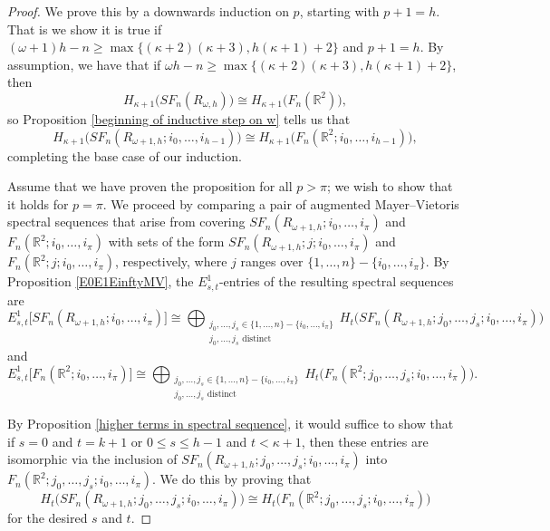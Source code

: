 \documentclass[pagebackref,colorlinks,citecolor=blue,linkcolor=blue,urlcolor=blue,filecolor=blue]{article}
\theoremstyle{definition}\newtheorem{definition}[thm]{Definition}
\theoremstyle{definition}
\newcommand{\R}{\ensuremath{\mathbb{R}}}
\begin{document}
\begin{proof}
We prove this by a downwards induction on $p$, starting with $p+1=h$.
That is we show it is true if $(\omega+1)h-n\ge\max\big\{(\kappa+2)(\kappa+3), h(\kappa+1)+2\big\}$ and $p+1=h$.
By assumption, we have that if $\omega h-n\ge\max\big\{(\kappa+2)(\kappa+3), h(\kappa+1)+2\big\}$, then
\[
H_{\kappa+1}\big(SF_{n}(R_{\omega,h})\big)\cong H_{\kappa+1}\big(F_{n}(\R^{2})\big),
\]
so Proposition \ref{beginning of inductive step on w} tells us that
\[
H_{\kappa+1}\big(SF_{n}(R_{\omega+1,h}; i_{0}, \dots, i_{h-1})\big)\cong  H_{\kappa+1}\big(F_{n}(\R^{2}; i_{0}, \dots, i_{h-1})\big),
\]
completing the base case of our induction.

Assume that we have proven the proposition for all $p>\pi$; we wish to show that it holds for $p=\pi$.
We proceed by comparing a pair of augmented Mayer--Vietoris spectral sequences that arise from covering $SF_{n}(R_{\omega+1, h};i_{0}, \dots, i_{\pi})$ and $F_{n}(\R^{2}; i_{0}, \dots, i_{\pi})$ with sets of the form $SF_{n}(R_{\omega+1, h};j;i_{0}, \dots, i_{\pi})$ and $F_{n}(\R^{2}; j; i_{0}, \dots, i_{\pi})$, respectively, where $j$ ranges over $\{1,\dots, n\}-\{i_{0},\dots, i_{\pi}\}$.
By Proposition \ref{E0E1EinftyMV}, the $E^{1}_{s,t}$-entries of the resulting spectral sequences are
\[
E^{1}_{s,t}\big[SF_{n}(R_{\omega+1, h};i_{0}, \dots, i_{\pi})\big]\cong \bigoplus_{\substack{j_{0}, \dots, j_{s}\in \{1,\dots, n\}-\{i_{0}, \dots, i_{\pi}\}\\j_{0}, \dots, j_{s} \text{ distinct}}} H_{t}\big(SF_{n}(R_{\omega+1, h}; j_{0}, \dots, j_{s}; i_{0}, \dots, i_{\pi})\big)
\]
and 
\[
E^{1}_{s,t}\big[F_{n}(\R^{2};i_{0}, \dots, i_{\pi})\big]\cong \bigoplus_{\substack{j_{0}, \dots, j_{s}\in \{1,\dots, n\}-\{i_{0}, \dots, i_{\pi}\}\\j_{0}, \dots, j_{s} \text{ distinct}}} H_{t}\big(F_{n}(\R^{2}; j_{0}, \dots, j_{s}; i_{0}, \dots, i_{\pi})\big).
\]

By Proposition \ref{higher terms in spectral sequence}, it would suffice to show that if $s=0$ and $t=k+1$ or $0\le s\le h-1$ and $t<\kappa+1$, then these entries are isomorphic via the inclusion of $SF_{n}(R_{\omega+1, h}; j_{0}, \dots, j_{s}; i_{0}, \dots, i_{\pi})$ into  $F_{n}(\R^{2}; j_{0}, \dots, j_{s}; i_{0}, \dots, i_{\pi})$. 
We do this by proving that 
\[
H_{t}\big(SF_{n}(R_{\omega+1, h}; j_{0}, \dots, j_{s}; i_{0}, \dots, i_{\pi})\big)\cong H_{t}\big(F_{n}(\R^{2}; j_{0}, \dots, j_{s}; i_{0}, \dots, i_{\pi})\big)
\]
for the desired $s$ and $t$.


\end{proof}
\end{document}
